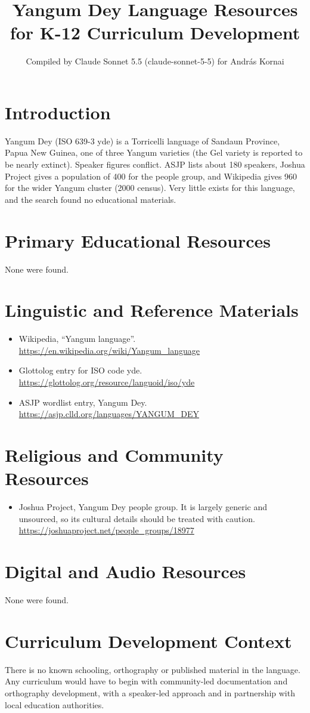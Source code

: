 \documentclass[12pt]{article}
\title{Yangum Dey Language Resources for K-12 Curriculum Development}
\author{Compiled by Claude Sonnet 5.5 (claude-sonnet-5-5) for Andr\'as Kornai}
\date{}
\begin{document}
\maketitle

\section{Introduction}
Yangum Dey (ISO 639-3 yde) is a Torricelli language of Sandaun Province, Papua New Guinea, one of three Yangum varieties (the Gel variety is reported to be nearly extinct). Speaker figures conflict. ASJP lists about 180 speakers, Joshua Project gives a population of 400 for the people group, and Wikipedia gives 960 for the wider Yangum cluster (2000 census). Very little exists for this language, and the search found no educational materials.

\section{Primary Educational Resources}
None were found.

\section{Linguistic and Reference Materials}
\begin{itemize}
\item Wikipedia, ``Yangum language''. \url{https://en.wikipedia.org/wiki/Yangum_language}
\item Glottolog entry for ISO code yde. \url{https://glottolog.org/resource/languoid/iso/yde}
\item ASJP wordlist entry, Yangum Dey. \url{https://asjp.clld.org/languages/YANGUM_DEY}
\end{itemize}

\section{Religious and Community Resources}
\begin{itemize}
\item Joshua Project, Yangum Dey people group. It is largely generic and unsourced, so its cultural details should be treated with caution. \url{https://joshuaproject.net/people_groups/18977}
\end{itemize}

\section{Digital and Audio Resources}
None were found.

\section{Curriculum Development Context}
There is no known schooling, orthography or published material in the language. Any curriculum would have to begin with community-led documentation and orthography development, with a speaker-led approach and in partnership with local education authorities.
\end{document}
